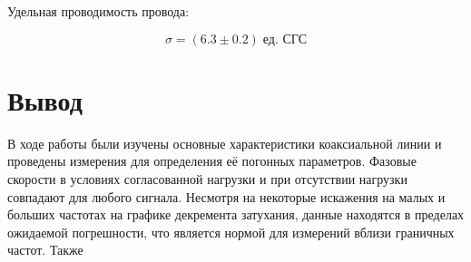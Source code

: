 \documentclass[a4paper, 12pt]{article}
\begin{document}
Удельная проводимость провода:

$$ \sigma = (6.3 \pm 0.2) \; \text{ед. СГС} $$

\section*{Вывод}

 В ходе работы были изучены основные характеристики коаксиальной линии и проведены измерения для определения её погонных параметров. Фазовые скорости в условиях согласованной нагрузки и при отсутствии нагрузки совпадают для любого сигнала. Несмотря на некоторые искажения на малых и больших частотах на графике декремента затухания, данные находятся в пределах ожидаемой погрешности, что является нормой для измерений вблизи граничных частот. Также 
\end{document}
